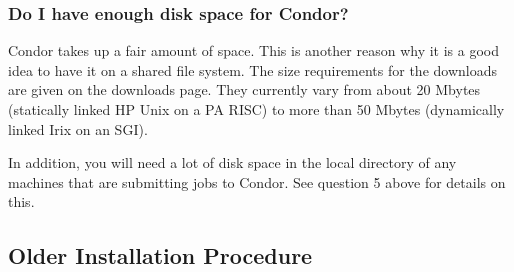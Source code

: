 \subsubsection{Do I have enough disk space for Condor?}

Condor takes up a fair amount of space.
This is another reason why it is a good idea to have it on a shared
file system.
The size requirements for the downloads are given on the
downloads page.
They currently vary from about 20 Mbytes (statically linked HP Unix
on a PA RISC)
to more than 50 Mbytes (dynamically linked Irix on an SGI).



In addition, you will need a lot of disk space in the local directory
of any machines that are submitting jobs to Condor.  See question 5
above for details on this.


\subsection{\label{sec:install-procedure}
Older Installation Procedure}


